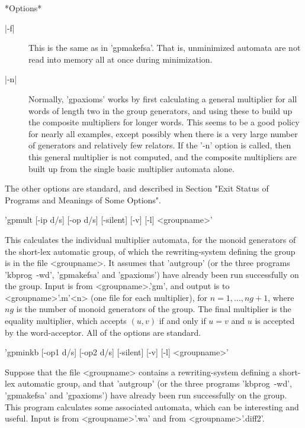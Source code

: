 *Options*
\begin{description}
\item[|-f|]
This is the same as in 'gpmakefsa'. That is, unminimized automata are not
read into memory all at once during minimization.
\item[|-n|]
Normally, 'gpaxioms' works by first calculating a general multiplier for
all words of length two in the group generators, and using these to
build up the composite multipliers for longer words. This seems to be
a good policy for nearly all examples, except possibly when there is
a very large number of generators and relatively few relators.
If the '-n' option is called, then this general multiplier is not
computed, and the composite multipliers are built up from the
single basic multiplier automata alone.
\end{description}

The other options are standard, and described in Section 
"Exit Status of Programs and Meanings of Some Options".

'gpmult [-ip d/s] [-op d/s] [-silent] [-v] [-l] <groupname>'

This calculates the individual multiplier automata, for the monoid
generators of the short-lex automatic group, of which the rewriting-system
defining the group is in the file <groupname>.
It assumes that 'autgroup' (or the three programs 'kbprog\ -wd', 'gpmakefsa'
and 'gpaxioms') have already been run successfully on the group.
Input is from <groupname>.'gm', and output is to <groupname>'.m'<n>
(one file for each multiplier), for $n = 1, \ldots , ng+1$, where $ng$ is
the number of monoid generators of the group. The final multiplier is
the equality multiplier, which accepts $(u,v)$ if and only if $u = v$ and
$u$ is accepted by the word-acceptor.
All of the options are standard.

'gpminkb [-op1 d/s] [-op2 d/s] [-silent] [-v] [-l] <groupname>'

Suppose that the file <groupname> contains a rewriting-system
defining a short-lex automatic group,
and that 'autgroup' (or the three programs 'kbprog\ -wd', 'gpmakefsa'
and 'gpaxioms') have already been run successfully on the group.
This program calculates some associated automata, which can be
interesting and useful. Input is from <groupname>'.wa' and from
<groupname>'.diff2'.

